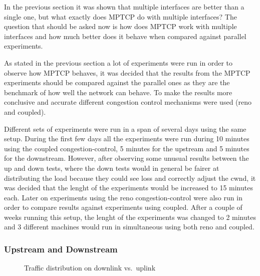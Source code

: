 In the previous section it was shown that multiple interfaces are better than a
single one, but what exactly does MPTCP do with multiple interfaces? The
question that should be asked now is how does MPTCP work with multiple
interfaces and how much better does it behave when compared against parallel
experiments.

As stated in the previous section a lot of experiments were run in order to
observe how MPTCP behaves, it was decided that the results from the MPTCP
experiments should be compared against the parallel ones as they are the
benchmark of how well the network can behave. To make the results more
conclusive and accurate different congestion control mechanisms were used (reno
and coupled).

Different sets of experiments were run in a span of several days using the same
setup. During the first few days all the experiments were run during 10 minutes
using the coupled congestion-control, 5 minutes for the upstream and 5 minutes
for the downstream. However, after observing some unusual results between the up
and down tests, where the down tests would in general be fairer at distributing
the load because they could see loss and correctly adjust the cwnd, it was
decided that the lenght of the experiments would be increased to 15 minutes
each. Later on experiments using the reno congestion-control were also run in
order to compare results against experiments using coupled. After a couple of
weeks running this setup, the lenght of the experiments was changed to 2 minutes
and 3 different machines would run in simultaneous using both reno and coupled.


\subsubsection{Upstream and Downstream}

\begin{figure}[h]
 \centering
 \subfloat[][downlink] {\
   \scalebox{0.55}{}\label{graph:down-fair}
 }
 \subfloat[][uplink] {\
   \scalebox{0.55}{}\label{graph:up-fair}
 }

 \caption{Traffic distribution on downlink vs.\ uplink}\label{graph:interference}
\end{figure}

